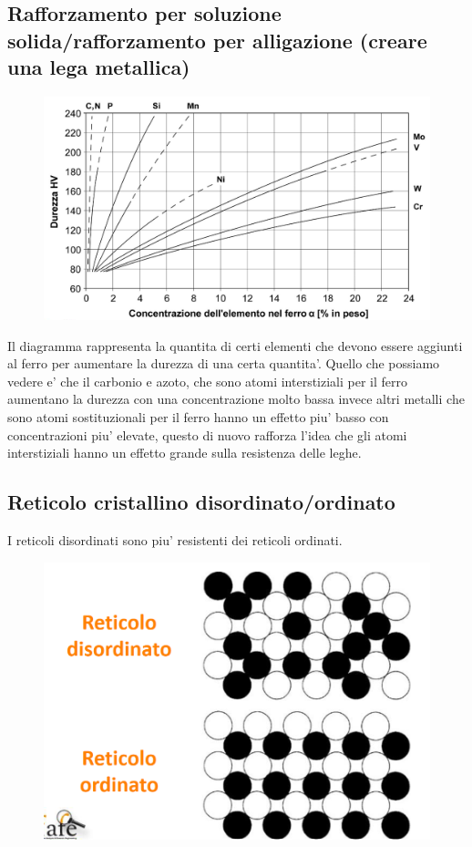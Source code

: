 \documentclass{article}
\begin{document}
        \subsection{Rafforzamento per soluzione solida/rafforzamento per alligazione (creare una lega metallica)}
            \begin{figure}[ht]
                \centering
                \includegraphics[width=.85\linewidth]{Rafforzamento per soluzione solida.png}
            \end{figure}
            Il diagramma rappresenta la quantita di certi elementi che devono essere aggiunti al ferro per aumentare la durezza di una certa quantita'.
            Quello che possiamo vedere e' che il carbonio e azoto, che sono atomi interstiziali per il ferro aumentano la durezza con una concentrazione 
            molto bassa invece altri metalli che sono atomi sostituzionali per il ferro hanno un effetto piu' basso con concentrazioni piu' elevate, questo 
            di nuovo rafforza l'idea che gli atomi interstiziali hanno un effetto grande sulla resistenza delle leghe.
        \subsection{Reticolo cristallino disordinato/ordinato}
            I reticoli disordinati sono piu' resistenti dei reticoli ordinati.
            \begin{figure}[ht]
                \centering
                \includegraphics[width=.75\linewidth]{Disordinato Ordinato.png}
            \end{figure}
\end{document}
